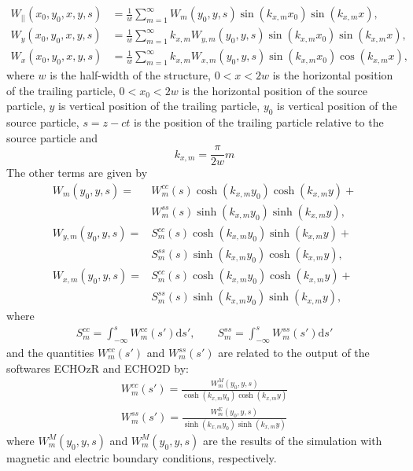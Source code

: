 \begin{apendicesenv}
    \begin{align}
		W_{||}(x_0,y_0,x,y,s) &= \frac1w\sum_{m=1}^\infty W_m(y_0,y,s)\sin(k_{x,m}x_0)\sin(k_{x,m}x), \\[4mm]
		W_y(x_0,y_0,x,y,s) &= \frac1w\sum_{m=1}^\infty k_{x,m}W_{y,m}(y_0,y,s)\sin(k_{x,m}x_0)\sin(k_{x,m}x), \\[4mm]
		W_x(x_0,y_0,x,y,s) &= \frac1w\sum_{m=1}^\infty k_{x,m}W_{x,m}(y_0,y,s)\sin(k_{x,m}x_0)\cos(k_{x,m}x),
    \end{align}
    where $w$ is the half-width of the structure, $0<x<2w$ is the horizontal position of the trailing particle, $0<x_0<2w$ is the horizontal position of the source particle, $y$ is vertical position of the trailing particle, $y_0$ is vertical position of the source particle, $s=z-ct$ is the position of the trailing particle relative to the source particle and
    \begin{equation}
    k_{x,m} = \frac{\pi}{2w}m
    \end{equation}
    The other terms are given by
    \begin{align}
		W_m(y_0,y,s)     = &W^{cc}_m(s)\cosh(k_{x,m}y_0)\cosh(k_{x,m}y) +\\\nonumber
                           &W^{ss}_m(s)\sinh(k_{x,m}y_0)\sinh(k_{x,m}y), \\[4mm]
		W_{y,m}(y_0,y,s) = &S^{cc}_m(s)\cosh(k_{x,m}y_0)\sinh(k_{x,m}y) +\\\nonumber
                           &S^{ss}_m(s)\sinh(k_{x,m}y_0)\cosh(k_{x,m}y), \\[4mm]
		W_{x,m}(y_0,y,s) = &S^{cc}_m(s)\cosh(k_{x,m}y_0)\cosh(k_{x,m}y) +\\\nonumber
                           &S^{ss}_m(s)\sinh(k_{x,m}y_0)\sinh(k_{x,m}y),
    \end{align}
    where
    \begin{align}
		S^{cc}_m = \int_{-\infty}^s W^{cc}_m(s')\mathrm{d}s', \qquad S^{ss}_m = \int_{-\infty}^s W^{ss}_m(s')\mathrm{d}s'
    \end{align}
    and the quantities $W^{cc}_m(s')$ and $W^{ss}_m(s')$ are related to the output of the softwares ECHOzR and ECHO2D by:
    \begin{align}
		W^{cc}_m(s') = \frac{W_m^M(y_0,y,s)}{\cosh(k_{x,m}y_0)\cosh(k_{x,m}y)} \\[4mm]
		W^{ss}_m(s') = \frac{W_m^E(y_0,y,s)}{\sinh(k_{x,m}y_0)\sinh(k_{x,m}y)}
    \end{align}
    where $W_m^M(y_0,y,s)$ and $W_m^M(y_0,y,s)$ are the results of the simulation with magnetic and electric boundary conditions, respectively.



\end{apendicesenv}
